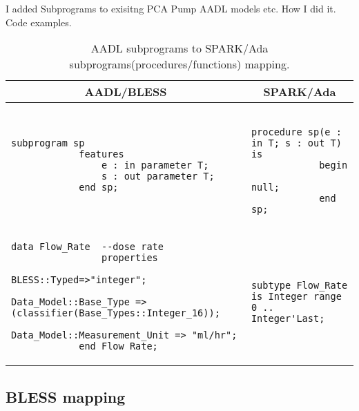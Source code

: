 I added Subprograms to exisitng PCA Pump AADL models etc.
How I did it. Code examples.

\begin{table}[!ht]
	\caption{AADL subprograms to SPARK/Ada subprograms(procedures/functions) mapping.}
	\label{table:subprograms_mapping}
	\centering
  	\begin{tabular}{ | p{3in} | p{3in} |}

		\hline
		\multicolumn{1}{|c|}{\textbf{AADL/BLESS}} & \multicolumn{1}{|c|}{\textbf{SPARK/Ada}} \\ \hline

		\begin{lstlisting}[language=aadl]
			subprogram sp
			features
				e : in parameter T;
				s : out parameter T;
			end sp;
		\end{lstlisting} 
		& 
		\begin{lstlisting}
			procedure sp(e : in T; s : out T) is 
			begin
				null;
			end sp;
		\end{lstlisting} 

		\\ \hline

		\begin{lstlisting}[language=aadl]
			data Flow_Rate  --dose rate
  				properties
    				BLESS::Typed=>"integer";
    				Data_Model::Base_Type => (classifier(Base_Types::Integer_16));
    				Data_Model::Measurement_Unit => "ml/hr";
			end Flow_Rate;
		\end{lstlisting} 
		& 
		\begin{lstlisting}
			subtype Flow_Rate is Integer range 0 .. Integer'Last;
		\end{lstlisting} 

		\\ \hline
	\end{tabular}
\end{table}



\subsection{BLESS mapping}
\label{codegen:mapping:bless}

